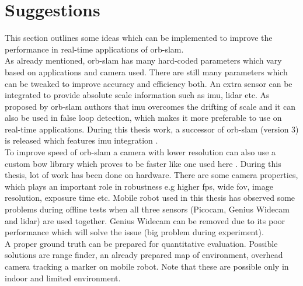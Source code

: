 \section{Suggestions}
This section outlines some ideas which can be implemented to improve the performance in real-time applications of \acrshort{orb}-\acrshort{slam}.\\
\newline As already mentioned, \acrshort{orb}-\acrshort{slam} has many hard-coded parameters which vary based on applications and camera used. There are still many parameters which can be tweaked to improve accuracy and efficiency both. An extra sensor can be integrated to provide absolute scale information such as \acrshort{imu}, \acrshort{lidar} etc. As proposed by \acrshort{orb}-\acrshort{slam} authors \cite{orbslam} that \acrshort{imu} overcomes the drifting of scale and it can also be used in false loop detection, which makes it more preferable to use on real-time applications. During this thesis work, a successor of \acrshort{orb}-\acrshort{slam} (version 3) is released which features \acrshort{imu} integration \cite{ORBSLAM3}.\\
\newline 
To improve speed of \acrshort{orb}-\acrshort{slam} a camera with lower resolution can also use a custom \acrshort{bow} library which proves to be faster like one used here \cite{Fbow}. During this thesis, lot of work has been done on hardware. There are some camera properties, which plays an important role in robustness e.g higher \acrshort{fps}, wide \acrshort{fov}, image resolution, exposure time etc. Mobile robot used in this thesis has observed some problems during offline tests when all three sensors (Picocam, Genius Widecam and \acrshort{lidar}) are used together. Genius Widecam can be removed due to its poor performance which will solve the issue (big problem during experiment). \\
\newline A proper ground truth can be prepared for quantitative evaluation. Possible solutions are range finder, an already prepared map of environment, overhead camera tracking a marker on mobile robot. Note that these are possible only in indoor and limited environment.  
